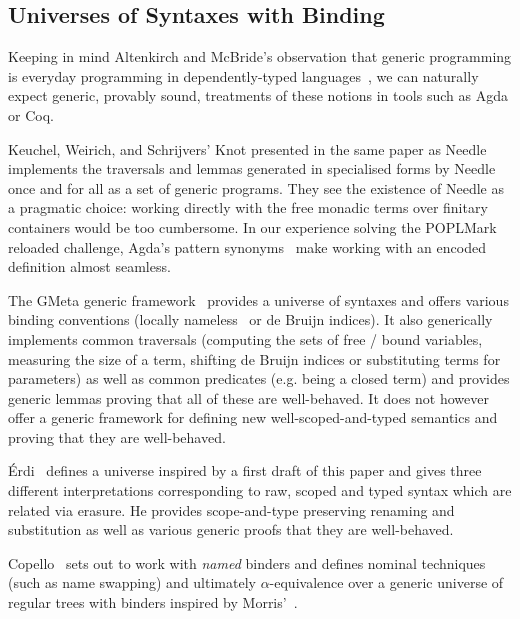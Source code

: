 \subsection{Universes of Syntaxes with Binding} Keeping in mind Altenkirch
and McBride's observation that generic programming is everyday programming
in dependently-typed languages~\citeyear{genericprogramming-dtp}, we can naturally
expect generic, provably sound, treatments of these notions in tools such as
Agda or Coq.

Keuchel, Weirich, and Schrijvers' Knot presented in the same paper as
Needle~\citeyear{needleandknot} implements the traversals and lemmas generated
in specialised forms by Needle once and for all as a set of generic programs.
They see the existence of Needle as a pragmatic choice: working directly with
the free monadic terms over finitary containers would be too cumbersome. In
our experience solving the POPLMark reloaded challenge, Agda's pattern
synonyms~\cite{Pickering:patsyn} make working with an encoded definition almost
seamless.

The GMeta generic framework~\citeyear{gmeta} provides a universe of syntaxes
and offers various binding conventions (locally nameless~\cite{Charguéraud2012}
or de Bruijn indices). It also generically implements common traversals (computing
the sets of free / bound variables, measuring the size of a term, shifting
de Bruijn indices or substituting terms for parameters) as well as common
predicates (e.g. being a closed term) and provides generic lemmas proving that
all of these are well-behaved. It does not however offer a generic framework
for defining new well-scoped-and-typed semantics and proving that they are
well-behaved.

Érdi~\citeyear{gergodraft} defines a universe inspired by a first draft of this
paper and gives three different interpretations corresponding to raw, scoped
and typed syntax which are related via erasure. He provides scope-and-type
preserving renaming and substitution as well as various generic proofs that
they are well-behaved.

Copello~\citeyear{copello2017} sets out to work with \emph{named} binders and
defines nominal techniques (such as name swapping) and ultimately $\alpha$-equivalence
over a generic universe of regular trees with binders inspired by Morris'~\citeyear{morris-regulartt}.




